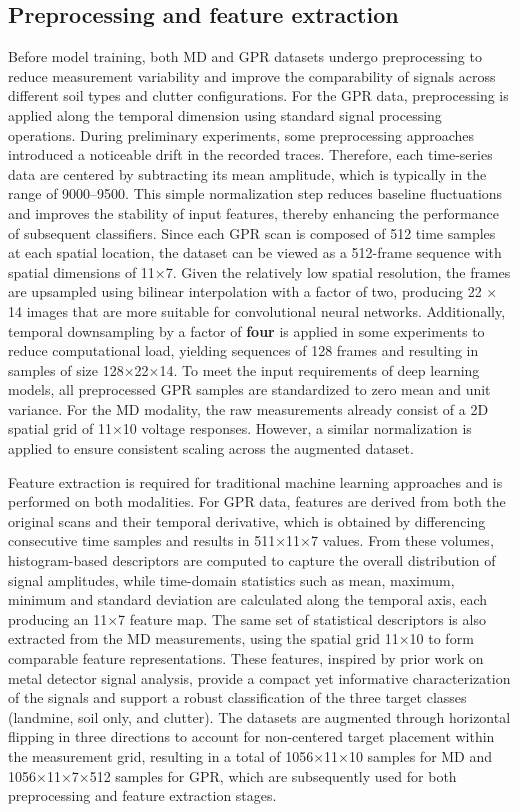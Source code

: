 \documentclass{ieeeaccess}
\begin{document}
\subsection{Preprocessing and feature extraction}
Before model training, both MD and GPR datasets undergo preprocessing to reduce measurement variability and improve the comparability of signals across different soil types and clutter configurations. For the GPR data, preprocessing is applied along the temporal dimension using standard signal processing operations. During preliminary experiments, some preprocessing approaches introduced a noticeable drift in the recorded traces. Therefore, each time-series data are centered by subtracting its mean amplitude, which is typically in the range of 9000–9500. This simple normalization step reduces baseline fluctuations and improves the stability of input features, thereby enhancing the performance of subsequent classifiers. Since each GPR scan is composed of 512 time samples at each spatial location, the dataset can be viewed as a 512-frame sequence with spatial dimensions of 11×7. Given the relatively low spatial resolution, the frames are upsampled using bilinear interpolation with a factor of two, producing  22 × 14 images that are more suitable for convolutional neural networks. Additionally, temporal downsampling by a factor of \textbf{four} is applied in some experiments to reduce computational load, yielding sequences of 128 frames and resulting in samples of size 128×22×14. To meet the input requirements of deep learning models, all preprocessed GPR samples are standardized to zero mean and unit variance. For the MD modality, the raw measurements already consist of a 2D spatial grid of 11×10 voltage responses. However, a similar normalization is applied to ensure consistent scaling across the augmented dataset.

Feature extraction is required for traditional machine learning approaches and is performed on both modalities. For GPR data, features are derived from both the original scans and their temporal derivative, which is obtained by differencing consecutive time samples and results in 511×11×7 values. From these volumes, histogram-based descriptors are computed to capture the overall distribution of signal amplitudes, while time-domain statistics such as mean, maximum, minimum and standard deviation are calculated along the temporal axis, each producing an 11×7 feature map. The same set of statistical descriptors is also extracted from the MD measurements, using the spatial grid 11×10 to form comparable feature representations. These features, inspired by prior \cite{Safatly2020}  work on metal detector signal analysis, provide a compact yet informative characterization of the signals and support a robust classification of the three target classes (landmine, soil only, and clutter). The datasets are augmented through horizontal flipping in three directions to account for non-centered target placement within the measurement grid, resulting in a total of 1056×11×10 samples for MD and 1056×11×7×512 samples for GPR, which are subsequently used for both preprocessing and feature extraction stages.
\end{document}
